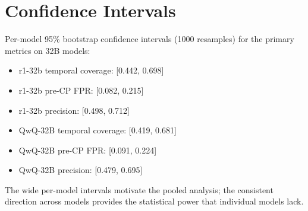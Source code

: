 \documentclass[11pt,a4paper]{article}
\begin{document}
\appendix

\section{Confidence Intervals}

Per-model 95\% bootstrap confidence intervals (1000 resamples) for the primary metrics on 32B models:

\begin{itemize}
\item r1-32b temporal coverage: [0.442, 0.698]
\item r1-32b pre-CP FPR: [0.082, 0.215]
\item r1-32b precision: [0.498, 0.712]
\item QwQ-32B temporal coverage: [0.419, 0.681]
\item QwQ-32B pre-CP FPR: [0.091, 0.224]
\item QwQ-32B precision: [0.479, 0.695]
\end{itemize}

The wide per-model intervals motivate the pooled analysis; the consistent direction across models provides the statistical power that individual models lack.
\end{document}
